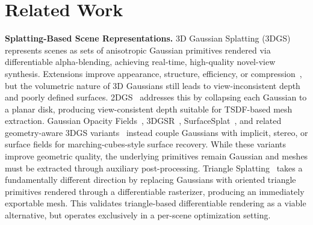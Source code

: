 \documentclass{llmxive}
\providecommand{\boldstart}[1]{\vspace{0.1in}\noindent\textbf{#1}}
\begin{document}
\section{Related Work}

\boldstart{Splatting-Based Scene Representations.}
3D Gaussian Splatting (3DGS)~\citep{kerbl20233d} represents scenes as sets of anisotropic Gaussian primitives rendered via differentiable alpha-blending, achieving real-time, high-quality novel-view synthesis. Extensions improve appearance, structure, efficiency, or compression~\citep{zhang2024fregs,jiang2024gaussianshader,lu2024scaffold,peng2024bags,zhao2024bad,lee2024compact,chen2024hac,fan2024lightgaussian,niedermayr2024compressed}, but the volumetric nature of 3D Gaussians still leads to view-inconsistent depth and poorly defined surfaces. 2DGS~\citep{huang20242d} addresses this by collapsing each Gaussian to a planar disk, producing view-consistent depth suitable for TSDF-based mesh extraction. Gaussian Opacity Fields~\citep{yu2024gaussian}, 3DGSR~\citep{lyu20243dgsr}, SurfaceSplat~\citep{gao2025surfacesplat}, and related geometry-aware 3DGS variants~\citep{fan2024trim,wolf2024surface,cheng2024gaussianpro,ververas2024sags} instead couple Gaussians with implicit, stereo, or surface fields for marching-cubes-style surface recovery. While these variants improve geometric quality, the underlying primitives remain Gaussian and meshes must be extracted through auxiliary post-processing. Triangle Splatting~\citep{Held2025Triangle} takes a fundamentally different direction by replacing Gaussians with oriented triangle primitives rendered through a differentiable rasterizer, producing an immediately exportable mesh. This validates triangle-based differentiable rendering as a viable alternative, but operates exclusively in a per-scene optimization setting.
\end{document}
